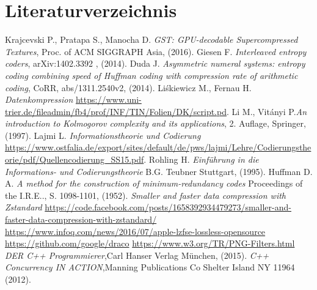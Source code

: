\documentclass[a4paper,12pt]{article}
\begin{document}
\section{Literaturverzeichnis}
\thispagestyle{plain}
\begin{thebibliography}{DiplRS}
 Krajcevski P., Pratapa S., Manocha D. {\it GST: GPU-decodable Supercompressed Textures},  Proc. of ACM SIGGRAPH Asia, (2016).
  Giesen F. {\it Interleaved entropy coders},  arXiv:1402.3392 , (2014).
  Duda J. {\it Asymmetric numeral systems: entropy coding combining speed of Huffman coding with compression rate of arithmetic coding},  CoRR, abs/1311.2540v2, (2014).
 Li\'{s}kiewicz M., Fernau H. {\it Datenkompression} 
\url{ https://www.uni-trier.de/fileadmin/fb4/prof/INF/TIN/Folien/DK/script.pd}.
  Li M.,  Vit\'{a}nyi P.{\it An introduction to Kolmogorov complexity and its applications}, 2. Auflage, Springer, (1997).
 Lajmi L. {\it Informationstheorie und Codierung}
\url{https://www.ostfalia.de/export/sites/default/de/pws/lajmi/Lehre/Codierungstheorie/pdf/Quellencodierung_SS15.pdf}.
 Rohling H. {\it Einführung in die Informations- und Codierungstheorie} B.G. Teubner Stuttgart, (1995).
 Huffman D. A. {\it A method for the construction of minimum-redundancy codes} Proceedings of the I.R.E.., S. 1098-1101, (1952).
 {\it Smaller and faster data compression with Zstandard} \url{https://code.facebook.com/posts/1658392934479273/smaller-and-faster-data-compression-with-zstandard/}
 \url{https://www.infoq.com/news/2016/07/apple-lzfse-lossless-opensource}
 \url{https://github.com/google/draco}
 \url{https://www.w3.org/TR/PNG-Filters.html}
 {\it DER C++ Programmierer},Carl Hanser Verlag München, (2015).
 {\it C++ Concurrency IN ACTION},Manning Publications Co Shelter Island NY 11964 (2012).
\end{thebibliography}
\end{document}
